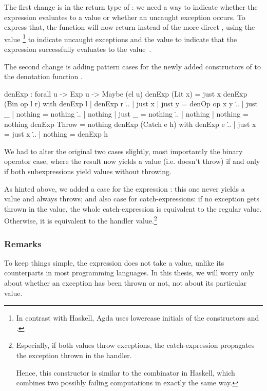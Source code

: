 The first change is in the return type of : we need a way to
indicate whether the expression evaluates to a value or whether an uncaught
exception occurs. To express that, the function  will now return
 instead of the more direct , using the value
\footnote{In contrast with Haskell, Agda uses lowercase initials
of the constructors  and .} to indicate uncaught
exceptions and the value  to indicate that the expression
successfully evaluates to the value~.

The second change is adding pattern cases for the newly added constructors
of  to the denotation function .

\begin{code}
  denExp : forall {u} -> Exp u -> Maybe (el u)
  denExp (Lit x) = just x
  denExp (Bin op l r) with denExp l | denExp r
  \... | just x  | just y  = denOp op x y
  \... | just _  | nothing = nothing
  \... | nothing | just _  = nothing
  \... | nothing | nothing = nothing
  denExp Throw = nothing
  denExp (Catch e h) with denExp e
  \... | just x  = just x
  \... | nothing = denExp h 
\end{code}

\noindent We had to alter the original two cases slightly, most importantly the
binary operator case, where the result now yields a value (i.e.  doesn't throw)
if and only if both subexpressions yield values without throwing.

As hinted above, we added a case for the expression : this one
never yields a value and always throws; and also case for catch-expressions: if
no exception gets thrown in the value, the whole catch-expression is equivalent
to the regular value.  Otherwise, it is equivalent to the handler
value.\footnote{Especially, if both values throw exceptions, the
catch-expression propagates the exception thrown in the handler.

Hence, this constructor is similar to the combinator  in
Haskell, which combines two possibly failing computations in exactly the same
way.}

\subsubsection{Remarks}

To keep things simple, the  expression does not take a value,
unlike its counterparts in most programming languages. In this thesis, we will
worry only about whether an exception has been thrown or not, not about its
particular value.

